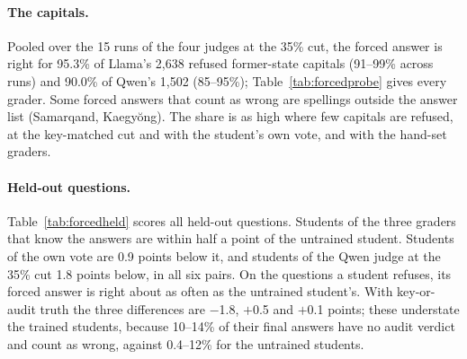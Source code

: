 \begin{table}[t]
\small
\centering
\setlength{\tabcolsep}{5pt}
\caption{Held-out questions with every refusal forced. \emph{Forced-choice accuracy}: share of questions whose final answer the answer key accepts, minus the same for the untrained student decoded in the same way (mean of student--dataset pairs; brackets: 95\% $t$ intervals over pairs; collapsed runs left out). Last two columns: on the questions a run refuses, how often its forced answer is right and how often the untrained student is right on the same questions.}
\label{tab:forcedheld}
\end{table}

\paragraph{The capitals.} Pooled over the 15 runs of the four judges at the 35\% cut, the forced answer is right for 95.3\% of Llama's 2{,}638 refused former-state capitals (91--99\% across runs) and 90.0\% of Qwen's 1{,}502 (85--95\%); Table~\ref{tab:forcedprobe} gives every grader. Some forced answers that count as wrong are spellings outside the answer list (Samarqand, Kaegy\u{o}ng). The share is as high where few capitals are refused, at the key-matched cut and with the student's own vote, and with the hand-set graders.

\paragraph{Held-out questions.} Table~\ref{tab:forcedheld} scores all held-out questions. Students of the three graders that know the answers are within half a point of the untrained student. Students of the own vote are 0.9 points below it, and students of the Qwen judge at the 35\% cut 1.8 points below, in all six pairs. On the questions a student refuses, its forced answer is right about as often as the untrained student's. With key-or-audit truth the three differences are $-$1.8, $+$0.5 and $+$0.1 points; these understate the trained students, because 10--14\% of their final answers have no audit verdict and count as wrong, against 0.4--12\% for the untrained students.

